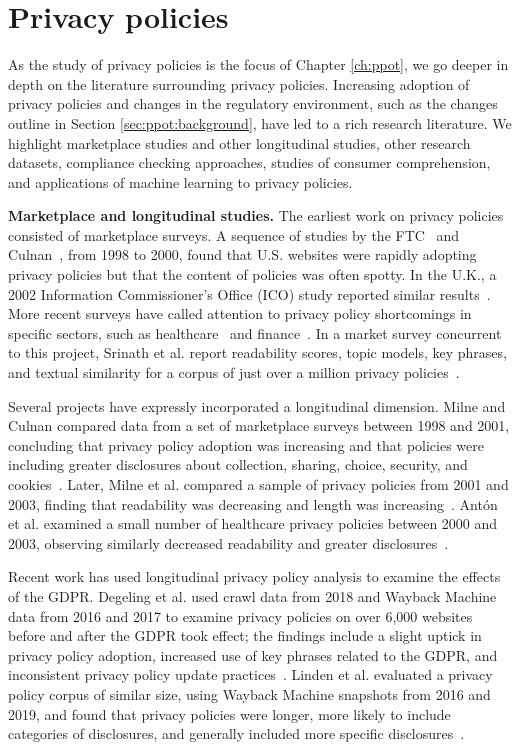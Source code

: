 \section{Privacy policies}
\label{sec:ppot:related}


As the study of privacy policies is the focus of Chapter \ref{ch:ppot}, we go deeper in depth on the literature surrounding privacy policies. Increasing adoption of privacy policies and changes in the regulatory environment, such as the changes outline in Section \ref{sec:ppot:background}, have led to a rich research literature. We highlight marketplace studies and other longitudinal studies, other research datasets, compliance checking approaches, studies of consumer comprehension, and applications of machine learning to privacy policies.

\textbf{Marketplace and longitudinal studies.}
The earliest work on privacy policies consisted of marketplace surveys. A sequence of studies by the FTC~\cite{ftc-privacy-survey1998, ftc-privacy-survey2000} and Culnan~\cite{culnan2000protecting}, from 1998 to 2000, found that U.S. websites were rapidly adopting privacy policies but that the content of policies was often spotty. In the U.K., a 2002 Information Commissioner's Office (ICO) study reported similar results~\cite{ico-survey2002}. More recent surveys have called attention to privacy policy shortcomings in specific sectors, such as healthcare~\cite{sunyaev15} and finance~\cite{bowers2017}. In a market survey concurrent to this project, Srinath et al. report readability scores, topic models, key phrases, and textual similarity for a corpus of just over a million privacy policies~\cite{srinath2020}.

Several projects have expressly incorporated a longitudinal dimension. Milne and Culnan compared data from a set of marketplace surveys between 1998 and 2001, concluding that privacy policy adoption was increasing and that policies were including greater disclosures about collection, sharing, choice, security, and cookies~\cite{milne2002}. Later, Milne et al. compared a sample of privacy policies from 2001 and 2003, finding that readability was decreasing and length was increasing~\cite{milne2006longitudinal}. Antón et al. examined a small number of healthcare privacy policies between 2000 and 2003, observing similarly decreased readability and greater disclosures~\cite{anton2007hipaa}.

Recent work has used longitudinal privacy policy analysis to examine the effects of the GDPR. Degeling et al. used crawl data from 2018 and Wayback Machine data from 2016 and 2017 to examine privacy policies on over 6,000 websites before and after the GDPR took effect; the findings include a slight uptick in privacy policy adoption, increased use of key phrases related to the GDPR, and inconsistent privacy policy update practices~\cite{degeling2018we}. Linden et al. evaluated a privacy policy corpus of similar size, using Wayback Machine snapshots from 2016 and 2019, and found that privacy policies were longer, more likely to include categories of disclosures, and generally included more specific disclosures~\cite{linden2020privacy}.

